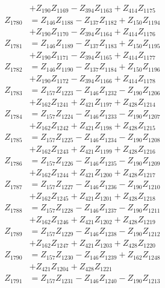 \begin{multicols}{2}
\begin{align}
&+ Z_{190}Z_{1169} - Z_{394}Z_{1163} + Z_{414}Z_{1175} \nonumber \\
Z_{1780} &= Z_{146}Z_{1188} - Z_{137}Z_{1182} + Z_{150}Z_{1194}  \nonumber \\
&+ Z_{190}Z_{1170} - Z_{394}Z_{1164} + Z_{414}Z_{1176} \nonumber \\
Z_{1781} &= Z_{146}Z_{1189} - Z_{137}Z_{1183} + Z_{150}Z_{1195}  \nonumber \\
&+ Z_{190}Z_{1171} - Z_{394}Z_{1165} + Z_{414}Z_{1177} \nonumber \\
Z_{1782} &= Z_{146}Z_{1190} - Z_{137}Z_{1184} + Z_{150}Z_{1196}  \nonumber \\
&+ Z_{190}Z_{1172} - Z_{394}Z_{1166} + Z_{414}Z_{1178} \nonumber \\
Z_{1783} &= Z_{157}Z_{1223} - Z_{146}Z_{1232} - Z_{190}Z_{1206}  \nonumber \\
&+ Z_{162}Z_{1241} + Z_{421}Z_{1197} + Z_{428}Z_{1214} \nonumber \\
Z_{1784} &= Z_{157}Z_{1224} - Z_{146}Z_{1233} - Z_{190}Z_{1207}  \nonumber \\
&+ Z_{162}Z_{1242} + Z_{421}Z_{1198} + Z_{428}Z_{1215} \nonumber \\
Z_{1785} &= Z_{157}Z_{1225} - Z_{146}Z_{1234} - Z_{190}Z_{1208}  \nonumber \\
&+ Z_{162}Z_{1243} + Z_{421}Z_{1199} + Z_{428}Z_{1216} \nonumber \\
Z_{1786} &= Z_{157}Z_{1226} - Z_{146}Z_{1235} - Z_{190}Z_{1209}  \nonumber \\
&+ Z_{162}Z_{1244} + Z_{421}Z_{1200} + Z_{428}Z_{1217} \nonumber \\
Z_{1787} &= Z_{157}Z_{1227} - Z_{146}Z_{1236} - Z_{190}Z_{1210}  \nonumber \\
&+ Z_{162}Z_{1245} + Z_{421}Z_{1201} + Z_{428}Z_{1218} \nonumber \\
Z_{1788} &= Z_{157}Z_{1228} - Z_{146}Z_{1237} - Z_{190}Z_{1211}  \nonumber \\
&+ Z_{162}Z_{1246} + Z_{421}Z_{1202} + Z_{428}Z_{1219} \nonumber \\
Z_{1789} &= Z_{157}Z_{1229} - Z_{146}Z_{1238} - Z_{190}Z_{1212}  \nonumber \\
&+ Z_{162}Z_{1247} + Z_{421}Z_{1203} + Z_{428}Z_{1220} \nonumber \\
Z_{1790} &= Z_{157}Z_{1230} - Z_{146}Z_{1239} + Z_{162}Z_{1248}  \nonumber \\
&+ Z_{421}Z_{1204} + Z_{428}Z_{1221} \nonumber \\
Z_{1791} &= Z_{157}Z_{1231} - Z_{146}Z_{1240} - Z_{190}Z_{1213}  \nonumber \\

\end{align}
\end{multicols}
